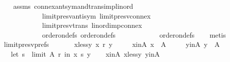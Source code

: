 \begin{isabellebody}
%
\isadelimproof
\ \ %
\endisadelimproof
%
\isatagproof
{}\isamarkupfalse%
\ assms\ connex{\isacharunderscore}{\kern0pt}antsym{\isacharunderscore}{\kern0pt}and{\isacharunderscore}{\kern0pt}trans{\isacharunderscore}{\kern0pt}imp{\isacharunderscore}{\kern0pt}lin{\isacharunderscore}{\kern0pt}ord\isanewline
\ \ \ \ \ \ \ \ \ \ \ \ limit{\isacharunderscore}{\kern0pt}presv{\isacharunderscore}{\kern0pt}antisym\ limit{\isacharunderscore}{\kern0pt}presv{\isacharunderscore}{\kern0pt}connex\isanewline
\ \ \ \ \ \ \ \ \ \ \ \ limit{\isacharunderscore}{\kern0pt}presv{\isacharunderscore}{\kern0pt}trans\ lin{\isacharunderscore}{\kern0pt}ord{\isacharunderscore}{\kern0pt}imp{\isacharunderscore}{\kern0pt}connex\isanewline
\ \ \ \ \ \ \ \ \ \ \ \ order{\isacharunderscore}{\kern0pt}on{\isacharunderscore}{\kern0pt}defs{\isacharparenleft}{\kern0pt}{}{\isacharparenright}{\kern0pt}\ order{\isacharunderscore}{\kern0pt}on{\isacharunderscore}{\kern0pt}defs{\isacharparenleft}{\kern0pt}{}{\isacharparenright}{\kern0pt}\isanewline
\ \ \ \ \ \ \ \ \ \ \ \ order{\isacharunderscore}{\kern0pt}on{\isacharunderscore}{\kern0pt}defs{\isacharparenleft}{\kern0pt}{}{\isacharparenright}{\kern0pt}\isanewline
\ \ \isamarkupfalse%
\ metis%
\endisatagproof
{\isafoldproof}%
%
\isadelimproof
\isanewline
%
\endisadelimproof
\isanewline
{}\isamarkupfalse%
\ limit{\isacharunderscore}{\kern0pt}presv{\isacharunderscore}{\kern0pt}prefs{}{\isacharcolon}{\kern0pt}\isanewline
\ \ \isanewline
\ \ \ \ x{\isacharunderscore}{\kern0pt}less{\isacharunderscore}{\kern0pt}y{\isacharcolon}{\kern0pt}\ {\isachardoublequoteopen}x\ {\isasympreceq}\isactrlsub r\ y{\isachardoublequoteclose}\ \isanewline
\ \ \ \ x{\isacharunderscore}{\kern0pt}in{\isacharunderscore}{\kern0pt}A{\isacharcolon}{\kern0pt}\ {\isachardoublequoteopen}x\ {\isasymin}\ A{\isachardoublequoteclose}\ \isanewline
\ \ \ \ y{\isacharunderscore}{\kern0pt}in{\isacharunderscore}{\kern0pt}A{\isacharcolon}{\kern0pt}\ {\isachardoublequoteopen}y\ {\isasymin}\ A{\isachardoublequoteclose}\isanewline
\ \ \ {\isachardoublequoteopen}let\ s\ {\isacharequal}{\kern0pt}\ limit\ A\ r\ in\ x\ {\isasympreceq}\isactrlsub s\ y{\isachardoublequoteclose}\isanewline
%
\isadelimproof
\ \ %
\endisadelimproof
%
\isatagproof
{}\isamarkupfalse%
\ x{\isacharunderscore}{\kern0pt}in{\isacharunderscore}{\kern0pt}A\ x{\isacharunderscore}{\kern0pt}less{\isacharunderscore}{\kern0pt}y\ y{\isacharunderscore}{\kern0pt}in{\isacharunderscore}{\kern0pt}A\isanewline

\end{isabellebody}
